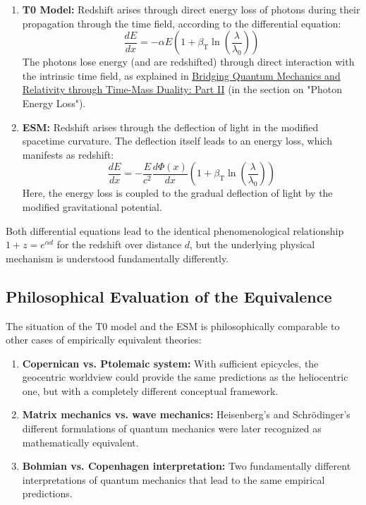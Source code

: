 \documentclass[12pt,a4paper]{article}
\newcommand{\betaT}{\beta_{\text{T}}}
\begin{document}
	\begin{enumerate}
		\item \textbf{T0 Model:} Redshift arises through direct energy loss of photons during their propagation through the time field, according to the differential equation:
		\begin{equation}
			\frac{dE}{dx} = -\alpha E \left(1 + \betaT \ln\left(\frac{\lambda}{\lambda_0}\right)\right)
		\end{equation}
		The photons lose energy (and are redshifted) through direct interaction with the intrinsic time field, as explained in \href{https://github.com/jpascher/T0-Time-Mass-Duality/tree/main/2/pdf/English/QMRelTimeMassPart2En.pdf}{Bridging Quantum Mechanics and Relativity through Time-Mass Duality: Part II} (in the section on "Photon Energy Loss").
		
		\item \textbf{ESM:} Redshift arises through the deflection of light in the modified spacetime curvature. The deflection itself leads to an energy loss, which manifests as redshift:
		\begin{equation}
			\frac{dE}{dx} = -\frac{E}{c^2} \frac{d\Phi(x)}{dx} \left(1 + \betaT \ln\left(\frac{\lambda}{\lambda_0}\right)\right)
		\end{equation}
		Here, the energy loss is coupled to the gradual deflection of light by the modified gravitational potential.
	\end{enumerate}
	
	Both differential equations lead to the identical phenomenological relationship $1 + z = e^{\alpha d}$ for the redshift over distance $d$, but the underlying physical mechanism is understood fundamentally differently.
	
	\subsection{Philosophical Evaluation of the Equivalence}
	\label{subsec:philosophical_evaluation}
	
	The situation of the T0 model and the ESM is philosophically comparable to other cases of empirically equivalent theories:
	
	\begin{enumerate}
		\item \textbf{Copernican vs. Ptolemaic system:} With sufficient epicycles, the geocentric worldview could provide the same predictions as the heliocentric one, but with a completely different conceptual framework.
		
		\item \textbf{Matrix mechanics vs. wave mechanics:} Heisenberg's and Schrödinger's different formulations of quantum mechanics were later recognized as mathematically equivalent.
		
		\item \textbf{Bohmian vs. Copenhagen interpretation:} Two fundamentally different interpretations of quantum mechanics that lead to the same empirical predictions.
	\end{enumerate}
	
\end{document}
